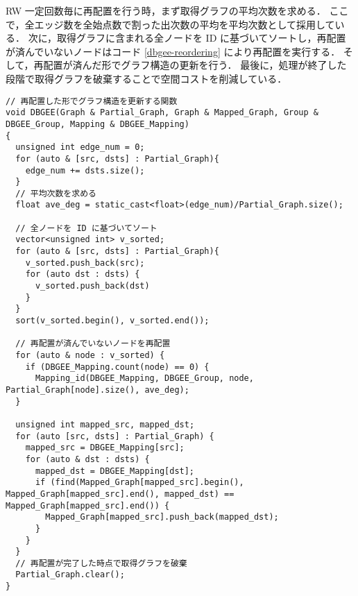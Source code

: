 RW 一定回数毎に再配置を行う時，まず取得グラフの平均次数を求める．
ここで，全エッジ数を全始点数で割った出次数の平均を平均次数として採用している．
次に，取得グラフに含まれる全ノードを ID に基づいてソートし，再配置が済んでいないノードはコード \ref{dbgee-reordering} により再配置を実行する．
そして，再配置が済んだ形でグラフ構造の更新を行う．
最後に，処理が終了した段階で取得グラフを破棄することで空間コストを削減している．
\begin{lstlisting}
// 再配置した形でグラフ構造を更新する関数
void DBGEE(Graph & Partial_Graph, Graph & Mapped_Graph, Group & DBGEE_Group, Mapping & DBGEE_Mapping)
{
  unsigned int edge_num = 0;
  for (auto & [src, dsts] : Partial_Graph){
    edge_num += dsts.size();
  }
  // 平均次数を求める
  float ave_deg = static_cast<float>(edge_num)/Partial_Graph.size();

  // 全ノードを ID に基づいてソート
  vector<unsigned int> v_sorted;
  for (auto & [src, dsts] : Partial_Graph){
    v_sorted.push_back(src);
    for (auto dst : dsts) {
      v_sorted.push_back(dst)
    }
  }
  sort(v_sorted.begin(), v_sorted.end());

  // 再配置が済んでいないノードを再配置
  for (auto & node : v_sorted) {
    if (DBGEE_Mapping.count(node) == 0) {
      Mapping_id(DBGEE_Mapping, DBGEE_Group, node, Partial_Graph[node].size(), ave_deg);
  }

  unsigned int mapped_src, mapped_dst;
  for (auto [src, dsts] : Partial_Graph) {
    mapped_src = DBGEE_Mapping[src];
    for (auto & dst : dsts) {
      mapped_dst = DBGEE_Mapping[dst];
      if (find(Mapped_Graph[mapped_src].begin(), Mapped_Graph[mapped_src].end(), mapped_dst) == Mapped_Graph[mapped_src].end()) {
        Mapped_Graph[mapped_src].push_back(mapped_dst);
      }
    }
  }
  // 再配置が完了した時点で取得グラフを破棄
  Partial_Graph.clear();
}
\end{lstlisting}

